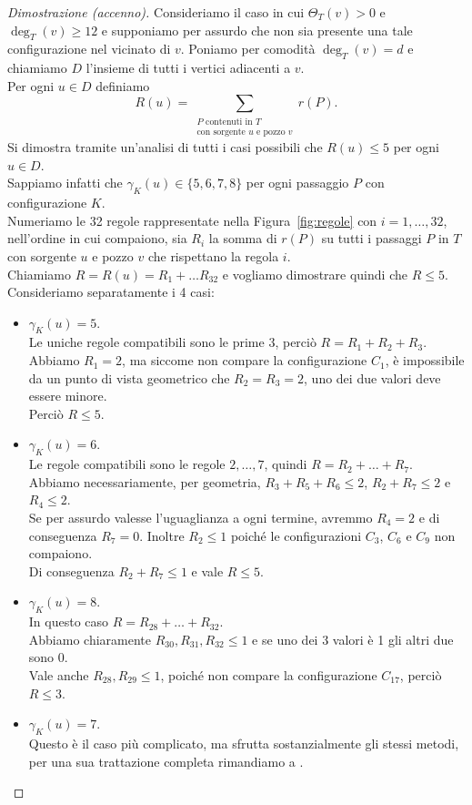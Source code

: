 \documentclass[a4paper,12pt,titlepage]{report}
\begin{document}
    \begin{proof}[Dimostrazione (accenno)]
    Consideriamo il caso in cui $\Theta_T(v) > 0$ e $\deg_T(v) \geq 12$ e supponiamo per assurdo che non sia presente una tale configurazione nel vicinato di $v$.
    Poniamo per comodità $\deg_T(v) = d$ e chiamiamo $D$ l'insieme di tutti i vertici adiacenti a $v$.
    \\Per ogni $u \in D$ definiamo
    \[
    R(u) = \sum_{\substack{P \text{ contenuti in } T \\ \text{con sorgente } u \text{ e pozzo } v}} r(P).
    \]
    Si dimostra tramite un'analisi di tutti i casi possibili che $R(u) \leq 5$ per ogni $u \in D$.
    \\Sappiamo infatti che $\gamma_K(u) \in \{5,6,7,8\}$ per ogni passaggio $P$ con configurazione $K$.
    \\Numeriamo le 32 regole rappresentate nella Figura~\ref{fig:regole} con $i = 1, \dots, 32$, nell'ordine in cui compaiono, sia $R_i$ la somma di $r(P)$ su tutti i passaggi $P$ in $T$ con sorgente $u$ e pozzo $v$ che rispettano la regola $i$.
    \\Chiamiamo $R = R(u) = R_1 + \dots R_{32}$ e vogliamo dimostrare quindi che $R \leq 5$.
    \\Consideriamo separatamente i 4 casi:
    \begin{itemize}
    	\item $\gamma_K(u) = 5$.
    	\\Le uniche regole compatibili sono le prime 3, perciò $R = R_1 + R_2 + R_3$.
    	\\Abbiamo $R_1 = 2$, ma siccome non compare la configurazione $C_1$, è impossibile da un punto di vista geometrico che $R_2 = R_3 = 2$, uno dei due valori deve essere minore.
    	\\Perciò $R \leq 5$.
    	\item $\gamma_K(u) = 6$.
    	\\Le regole compatibili sono le regole $2, \dots, 7$, quindi $R = R_2 + \dots + R_7$.
    	\\Abbiamo necessariamente, per geometria, $R_3 + R_5 + R_6 \leq 2$, $R_2 + R_7 \leq 2$ e $R_4 \leq 2$.
    	\\Se per assurdo valesse l'uguaglianza a ogni termine, avremmo $R_4 = 2$ e di conseguenza $R_7 = 0$. Inoltre $R_2 \leq 1$ poiché le configurazioni $C_3$, $C_6$ e $C_9$ non compaiono.
    	\\Di conseguenza $R_2 + R_7 \leq 1$ e vale $R \leq 5$.
    	\item $\gamma_K(u) = 8$.
    	\\In questo caso $R = R_{28} + \dots + R_{32}$. 
    	\\Abbiamo chiaramente $R_{30}, R_{31}, R_{32} \leq 1$ e se uno dei 3 valori è 1 gli altri due sono 0.
    	\\Vale anche $R_{28}, R_{29} \leq 1$, poiché non compare la configurazione $C_{17}$, perciò $R \leq 3$.
    	\item $\gamma_K(u) = 7$.
    	\\Questo è il caso più complicato, ma sfrutta sostanzialmente gli stessi metodi, per una sua trattazione completa rimandiamo a {\bfseries \cite{4CT}}.
    \end{itemize}
    

\end{proof}
\end{document}
